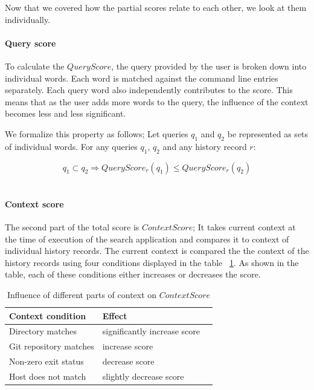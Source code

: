 \documentclass[thesis=M,english]{FITthesis}[2012/10/20]
\let\myRef\ref
\renewcommand\ref{\unskip~\myRef}
\begin{document}
Now that we covered how the partial scores relate to each other, we look at them individually.






\paragraph{Query score}

To calculate the \(QueryScore\), the query provided by the user is broken down into individual words. 
Each word is matched against the command line entries separately. Each query word also independently contributes to the score. This means that as the user adds more words to the query, the influence of the context becomes less and less significant.

We formalize this property as follows; Let queries \(q_1\) and \(q_2\) be represented as sets of individual words. For any queries \(q_1\), \(q_2\) and any history record \(r\):  

\[ q_1 \subset q_2 \Rightarrow QueryScore_r(q_1) \leq QueryScore_r(q_2)\]\

\paragraph{Context score}
The second part of the total score is \(ContextScore\); It takes current context at the time of execution of the search application and compares it to context of individual history records. 
The current context is compared the the context of the history records using four conditions displayed in the table \ref{tab:score-matching-context}. As shown in the table, each of these conditions either increases or decreases the score.

\begin{table}[h]
\centering
\begin{tabular}{lll}
\hline \hline
Context condition       & Effect \\
\hline
Directory matches      & significantly increase score \\ 
Git repository matches & increase score \\ 
Non-zero exit status   & decrease score \\
Host does not match    & slightly decrease score \\ 
\hline \hline
\end{tabular}
\caption{Influence of different parts of context on \(ContextScore\)}
\label{tab:score-matching-context}
\end{table}
\end{document}
